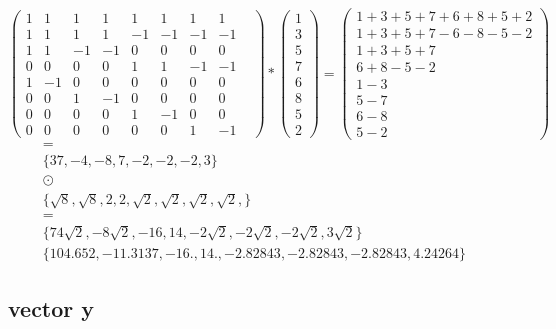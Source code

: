 \documentclass{article}
\begin{document}
\[ 
\begin{pmatrix} 
	1&1&1&1&1&1&1&1 \\ 
	1&1&1&1&-1&-1&-1&-1 \\
	1&1&-1&-1&0&0&0&0& \\ 
	0&0&0&0&1&1&-1&-1 \\ 
	1&-1&0&0&0&0&0&0& \\
	0&0&1&-1&0&0&0&0 \\ 
	0&0&0&0&1&-1&0&0& \\ 
	0&0&0&0&0&0&1&-1 
\end{pmatrix}
*
\begin{pmatrix}
  1 \\
  3 \\
  5 \\
  7 \\
  6 \\
  8 \\
  5 \\
  2 
\end{pmatrix}
=
\begin{pmatrix}
	1 + 3 + 5  + 7 + 6 + 8 + 5 + 2 \\
	1 + 3  + 5 + 7 - 6 - 8 -5 -2 \\
	1 + 3 + 5 + 7 \\
	6+ 8 -5 -2 \\
	1-3 \\
	5-7 \\
	6-8 \\
	5-2
\end{pmatrix}
\]
\begin{align*}
	=&\\
	\{ 37, -4, -8, 7, -2, -2, -2, 3 \} \\
	\odot&\\
\{ \sqrt{8}, \sqrt{8},2, 2, \sqrt{2}, \sqrt{2}, \sqrt{2}, \sqrt{2}, \} \\
    =&\\
	\{74 \sqrt{ 2 } , -8 \sqrt{ 2 } , -16 , 14 , -2 \sqrt{ 2 } , -2 \sqrt{ 2 } , -2 \sqrt{ 2 } , 3 \sqrt{ 2 }  \} \\
	\{104.652, -11.3137, -16., 14., -2.82843, -2.82843, -2.82843, 4.24264 \}
\end{align*}





\subsection{vector y}
\end{document}
